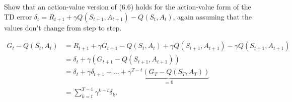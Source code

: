 
\begin{exercise}[Exercise 6.8]

Show that an action-value version of (6.6) holds for the action-value form
of the TD error $\delta_t = R_{t+1} + \gamma Q(S_{t+1}, A_{t+1}) - Q(S_t,A_t)$,
again assuming that the values don't change from step to step.

\end{exercise}


\begin{solution}

\begin{align*}
    G_t - Q(S_t, A_t) 
    &= R_{t+1} + \gamma G_{t+1} - Q(S_t,A_t) + \gamma Q(S_{t+1}, A_{t+1}) - \gamma Q(S_{t+1}, A_{t+1}) \\
    &= \delta_t + \gamma (G_{t+1} - Q(S_{t+1}, A_{t+1})) \\
    &= \delta_t + \gamma \delta_{t+1} + \dots + 
    \underbrace{\gamma^{T-t}(G_T - Q(S_T,A_T))}_{=0} \\
    &= \sum_{k=t}^{T-1} \gamma^{k-t} \delta_k.
\end{align*}

\end{solution}

    